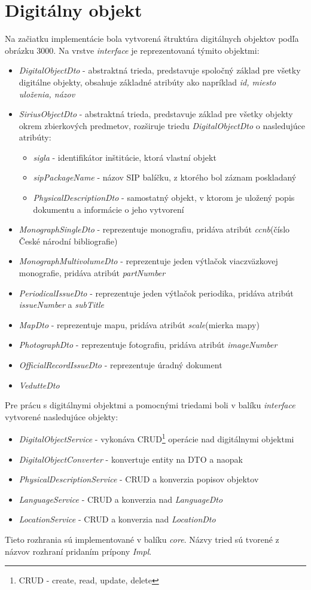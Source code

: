 \documentclass[
  print, %
  table,   %
  lof,     %
  nolot,     %
]{fithesis3}
\begin{document}
\section{Digitálny objekt}
Na začiatku implementácie bola vytvorená štruktúra digitálnych objektov podľa obrázku 3000. Na vrstve \textit{interface} je reprezentovaná týmito objektmi:
\begin{itemize}
	\item \textit{DigitalObjectDto} - abstraktná trieda, predstavuje spoločný základ pre všetky digitálne objekty, obsahuje základné atribúty ako napríklad \textit{id, miesto uloženia, názov}
	\item \textit{SiriusObjectDto} - abstraktná trieda, predstavuje základ pre všetky objekty okrem zbierkových predmetov, rozširuje triedu \textit{DigitalObjectDto} o nasledujúce atribúty:
	\begin{itemize}
		\item \textit{sigla} - identifikátor inštitúcie, ktorá vlastní objekt
		\item \textit{sipPackageName} - názov SIP balíčku, z ktorého bol záznam poskladaný
		\item \textit{PhysicalDescriptionDto} - samostatný objekt, v ktorom je uložený popis dokumentu a informácie o jeho vytvorení
	\end{itemize}
	\item \textit{MonographSingleDto} - reprezentuje monografiu, pridáva atribút \textit{ccnb}(číslo České národní bibliografie)
	\item \textit{MonographMultivolumeDto} - reprezentuje jeden výtlačok viaczväzkovej monografie, pridáva atribút \textit{partNumber}
	\item \textit{PeriodicalIssueDto} - reprezentuje jeden výtlačok periodika, pridáva atribút \textit{issueNumber} a \textit{subTitle}
	\item \textit{MapDto} - reprezentuje mapu, pridáva atribút \textit{scale}(mierka mapy)
	\item \textit{PhotographDto} - reprezentuje fotografiu, pridáva atribút \textit{imageNumber}
	\item \textit{OfficialRecordIssueDto} - reprezentuje úradný dokument
	\item \textit{VedutteDto}	
\end{itemize}
Pre prácu s digitálnymi objektmi a pomocnými triedami boli v balíku \textit{interface} vytvorené nasledujúce objekty:
\begin{itemize}
	\item \textit{DigitalObjectService} - vykonáva CRUD\footnote{CRUD - create, read, update, delete} operácie nad digitálnymi objektmi
	\item \textit{DigitalObjectConverter} - konvertuje entity na DTO a naopak
	\item \textit{PhysicalDescriptionService} - CRUD a konverzia popisov objektov
	\item \textit{LanguageService} - CRUD a konverzia nad \textit{LanguageDto}
	\item \textit{LocationService} - CRUD a konverzia nad \textit{LocationDto}
\end{itemize}
Tieto rozhrania sú implementované v balíku \textit{core}. Názvy tried sú tvorené z názvov rozhraní pridaním prípony \textit{Impl}.
\end{document}

